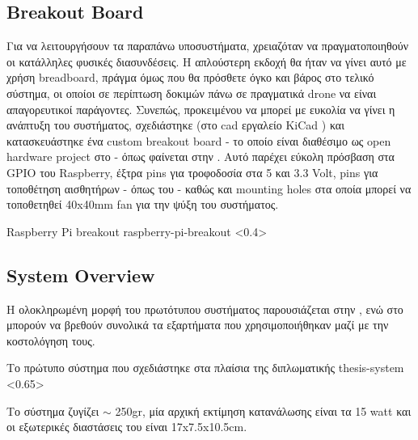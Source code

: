 
\subsection{Breakout Board}
Για να λειτουργήσουν τα παραπάνω υποσυστήματα, χρειαζόταν να πραγματοποιηθούν οι κατάλληλες φυσικές διασυνδέσεις. Η απλούστερη εκδοχή θα ήταν να γίνει αυτό με χρήση breadboard, πράγμα όμως που θα πρόσθετε όγκο και βάρος στο τελικό σύστημα, οι οποίοι σε περίπτωση δοκιμών πάνω σε πραγματικά drone να είναι απαγορευτικοί παράγοντες. Συνεπώς, προκειμένου να μπορεί με ευκολία να γίνει η ανάπτυξη του συστήματος, σχεδιάστηκε (στο cad εργαλείο KiCad \cite{KiCad}) και κατασκευάστηκε ένα custom breakout board - το οποίο είναι διαθέσιμο ως open hardware project στο \cite{raspberry-pi-fan-breadkout} - όπως φαίνεται στην . Αυτό παρέχει εύκολη πρόσβαση στα GPIO του Raspberry, έξτρα pins για τροφοδοσία στα 5 και 3.3 Volt, pins για τοποθέτηση αισθητήρων - όπως του  - καθώς και mounting holes στα οποία μπορεί να τοποθετηθεί 40x40mm fan για την ψύξη του συστήματος. 

%
{Raspberry Pi breakout}%
{raspberry-pi-breakout}%
<0.4>



\subsection{System Overview}
Η ολοκληρωμένη μορφή του πρωτότυπου συστήματος παρουσιάζεται στην , ενώ στο  μπορούν να βρεθούν συνολικά τα εξαρτήματα που χρησιμοποιήθηκαν μαζί με την κοστολόγηση τους. 

{Το πρώτυπο σύστημα που σχεδιάστηκε στα πλαίσια της διπλωματικής}%
{thesis-system}%
<0.65>

Το σύστημα ζυγίζει $\sim$ 250gr, μία αρχική εκτίμηση κατανάλωσης είναι τα 15 watt και οι εξωτερικές διαστάσεις του είναι 17x7.5x10.5cm.

